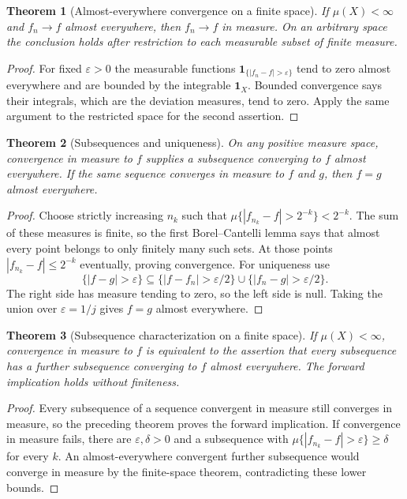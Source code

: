 \documentclass[11pt,oneside,openany]{book}
\newtheorem{theorem}{Theorem}[chapter]
\theoremstyle{definition}
\theoremstyle{remark}
\newcommand{\eps}{\varepsilon}\newcommand{\ee}{\varepsilon}
\newcommand{\one}{\mathbf1}\newcommand{\ind}[1]{\mathbf1_{#1}}
\newcommand{\family}[1]{}
\begin{document}
\begin{theorem}[Almost-everywhere convergence on a finite space]
\family{D11.07.finite_ae_to_measure}\label{d11:07:finite-ae-to-measure}
If $\mu(X)<\infty$ and $f_n\to f$ almost everywhere, then $f_n\to f$ in
measure. On an arbitrary space the conclusion holds after restriction to
each measurable subset of finite measure.
\end{theorem}
\begin{proof}
For fixed $\eps>0$ the measurable functions
$\one_{\{|f_n-f|>\eps\}}$ tend to zero almost everywhere and are bounded
by the integrable $\one_X$. Bounded convergence says their integrals,
which are the deviation measures, tend to zero. Apply the same argument
to the restricted space for the second assertion.
\end{proof}

\begin{theorem}[Subsequences and uniqueness]
\family{D11.07.measure_subsequence_uniqueness}\label{d11:07:measure-subsequence-uniqueness}
On any positive measure space, convergence in measure to $f$ supplies a
subsequence converging to $f$ almost everywhere. If the same sequence
converges in measure to $f$ and $g$, then $f=g$ almost everywhere.
\end{theorem}
\begin{proof}
Choose strictly increasing $n_k$ such that
$\mu\{|f_{n_k}-f|>2^{-k}\}<2^{-k}$. The sum of these measures is finite,
so the first Borel--Cantelli lemma says that almost every point belongs to
only finitely many such sets. At those points $|f_{n_k}-f|\leq2^{-k}$
eventually, proving convergence. For uniqueness use
\[
 \{|f-g|>\eps\}\subseteq
 \{|f-f_n|>\eps/2\}\cup\{|f_n-g|>\eps/2\}.
\]
The right side has measure tending to zero, so the left side is null.
Taking the union over $\eps=1/j$ gives $f=g$ almost everywhere.
\end{proof}

\begin{theorem}[Subsequence characterization on a finite space]
\family{D11.07.finite_subsequence_characterization}\label{d11:07:finite-subsequence-characterization}
If $\mu(X)<\infty$, convergence in measure to $f$ is equivalent to the
assertion that every subsequence has a further subsequence converging to
$f$ almost everywhere. The forward implication holds without finiteness.
\end{theorem}
\begin{proof}
Every subsequence of a sequence convergent in measure still converges in
measure, so the preceding theorem proves the forward implication.
If convergence in measure fails, there are $\eps,\delta>0$ and a
subsequence with $\mu\{|f_{n_k}-f|>\eps\}\geq\delta$ for every $k$.
An almost-everywhere convergent further subsequence would converge in
measure by the finite-space theorem, contradicting these lower bounds.
\end{proof}
\end{document}

